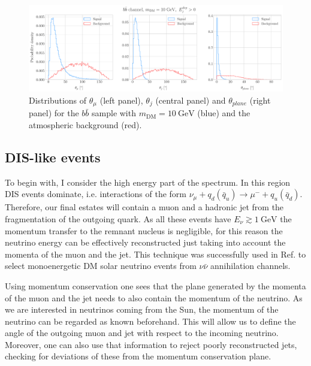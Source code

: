 \begin{figure}[t]
	\centering
	\includegraphics[width=0.95\linewidth]{Images/DM_Analysis/solardm_bb_100_dis_angular_dists.pdf}
	\caption[Angular distributions for the $b\bar{b}$ DIS sample with $m_{\mathrm{DM}} = 10 \ \mathrm{GeV}$ and the atmospheric background.]{Distributions of $\theta_{\mu}$ (left panel), $\theta_{j}$ (central panel) and $\theta_{plane}$ (right panel) for the $b\bar{b}$ sample with $m_{\mathrm{DM}} = 10 \ \mathrm{GeV}$ (blue) and the atmospheric background (red).}
	\label{fig:solardm_bb_100_dis_angular_dists}
\end{figure}

\subsection{DIS-like events}

To begin with, I consider the high energy part of the spectrum. In this region DIS events dominate, i.e. interactions of the form $\nu_{\mu} + q_{d}(\bar{q}_{u}) \rightarrow \mu^{-} + q_{u}(\bar{q}_{d})$. Therefore, our final estates will contain a muon and a hadronic jet from the fragmentation of the outgoing quark. As all these events have $E_{\nu} \gtrsim 1 \ \mathrm{GeV}$ the momentum transfer to the remnant nucleus is negligible, for this reason the neutrino energy can be effectively reconstructed just taking into account the momenta of the muon and the jet. This technique was successfully used in Ref. \cite{Rott2019} to select monoenergetic DM solar neutrino events from $\nu \bar{\nu}$ annihilation channels.

Using momentum conservation one sees that the plane generated by the momenta of the muon and the jet needs to also contain the momentum of the neutrino. As we are interested in neutrinos coming from the Sun, the momentum of the neutrino can be regarded as known beforehand. This will allow us to define the angle of the outgoing muon and jet with respect to the incoming neutrino. Moreover, one can also use that information to reject poorly reconstructed jets, checking for deviations of these from the momentum conservation plane.

